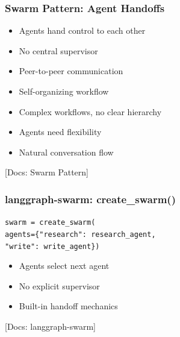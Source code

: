 \documentclass[aspectratio=169,11pt]{beamer}
\newcommand{\docref}[1]{{\scriptsize\color{docgray}[Docs: #1]}}
\begin{document}
\begin{frame}
\frametitle{Swarm Pattern: Agent Handoffs}
\begin{conceptbox}
\setlength{\itemsep}{1pt}
\begin{itemize}
\item Agents hand control to each other
\item No central supervisor
\item Peer-to-peer communication
\item Self-organizing workflow
\end{itemize}
\end{conceptbox}
\vspace{0.1cm}
\begin{tipbox}
\setlength{\itemsep}{1pt}
\begin{itemize}
\item Complex workflows, no clear hierarchy
\item Agents need flexibility
\item Natural conversation flow
\end{itemize}
\end{tipbox}
\docref{Swarm Pattern}
\end{frame}

\begin{frame}
\frametitle{langgraph-swarm: create\_swarm()}
\begin{tipbox}
\texttt{swarm = create\_swarm(}\\
\texttt{agents=\{"research": research\_agent,}\\
\texttt{"write": write\_agent\})}
\end{tipbox}
\vspace{0.1cm}
\begin{tipbox}
\setlength{\itemsep}{1pt}
\begin{itemize}
\item Agents select next agent
\item No explicit supervisor
\item Built-in handoff mechanics
\end{itemize}
\end{tipbox}
\docref{langgraph-swarm}
\end{frame}
\end{document}
